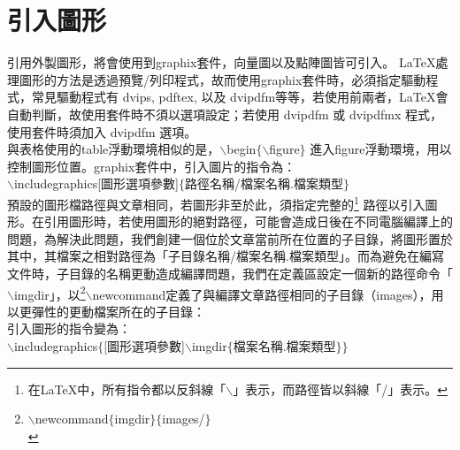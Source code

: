 \section{{\CB 引入圖形}}
	引用外製圖形，將會使用到graphix套件，向量圖以及點陣圖皆可引入。 \LaTeX 處理圖形的方法是透過預覽/列印程式，故而使用graphix套件時，必須指定驅動程式，常見驅動程式有 dvips, pdftex, 以及 dvipdfm等等，若使用前兩者，\LaTeX 會自動判斷，故使用套件時不須以選項設定；若使用 dvipdfm 或 dvipdfmx 程式，使用套件時須加入 dvipdfm 選項。 \\
	\indent 與表格使用的table浮動環境相似的是，$\backslash$begin$\{\backslash$figure$\}$ 進入figure浮動環境，用以控制圖形位置。graphix套件中，引入圖片的指令為： \\
	\indent $\backslash$includegraphics[圖形選項參數]$\{$路徑名稱/檔案名稱.檔案類型$\}$  \\	
	\indent 預設的圖形檔路徑與文章相同，若圖形非至於此，須指定完整的\footnote{在\LaTeX 中，所有指令都以反斜線「$\backslash$」表示，而路徑皆以斜線「/」表示。} 路徑以引入圖形。在引用圖形時，若使用圖形的絕對路徑，可能會造成日後在不同電腦編譯上的問題，為解決此問題，我們創建一個位於文章當前所在位置的子目錄，將圖形置於其中，其檔案之相對路徑為「子目錄名稱/檔案名稱.檔案類型」。而為避免在編寫文件時，子目錄的名稱更動造成編譯問題，我們在定義區設定一個新的路徑命令「$\backslash$imgdir」，以\footnote{$\backslash$newcommand$\{$imgdir$\}\{$images/$\}$ \\}$\backslash$newcommand定義了與編譯文章路徑相同的子目錄（images），用以更彈性的更動檔案所在的子目錄： \\ 
 	\indent 引入圖形的指令變為： \\
 	\indent $\backslash$includegraphics$\{$[圖形選項參數]$\backslash$imgdir$\{$檔案名稱.檔案類型$\}\}$
 	

